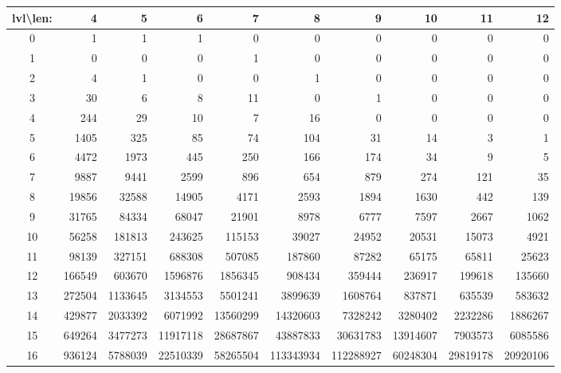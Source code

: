 \documentclass{article} %
\theoremstyle{definition}
\theoremstyle{theorem}
\theoremstyle{remark}
\theoremstyle{remark}
\begin{document}
    \begin{table}[!htbp]
        \vspace{-5pt}
        \footnotesize
        \begin{center}
        \setlength{\tabcolsep}{3.5pt}
            \begin{tabular}{|c||r|r|r|r|r|r|r|r|r|}
                \hline
                lvl{\bf\textbackslash}len: & 4 & 5 & 6 & 7 & 8 & 9 & 10 & 11 & 12 \\ \hline \hline

                0 & 1 & 1 & 1 & 0 & 0 & 0 & 0 & 0 & 0  \\\hline
                1 & 0 & 0 & 0 & 1 & 0 & 0 & 0 & 0 & 0  \\\hline
                2 & 4 & 1 & 0 & 0 & 1 & 0 & 0 & 0 & 0  \\\hline
                3 & 30 & 6 & 8 & 11 & 0 & 1 & 0 & 0 & 0 \\\hline
                4 & 244 & 29 & 10 & 7 & 16 & 0 & 0 & 0 & 0 \\\hline
                5 & 1405 & 325 & 85 & 74 & 104 & 31 & 14 & 3 & 1 \\\hline
                6 & 4472 & 1973 & 445 & 250 & 166 & 174 & 34 & 9 & 5 \\\hline
                7 & 9887 & 9441 & 2599 & 896 & 654 & 879 & 274 & 121 & 35 \\\hline
                8 & 19856 & 32588 & 14905 & 4171& 2593 & 1894 & 1630 & 442 & 139 \\\hline
                9 & 31765 & 84334 & 68047 & 21901 & 8978 & 6777 & 7597 & 2667 & 1062 \\\hline
                10 & 56258 & 181813 & 243625 & 115153 & 39027 & 24952 & 20531 & 15073 & 4921 \\\hline
                11 & 98139 & 327151 & 688308 & 507085 & 187860 & 87282 & 65175 & 65811 & 25623\\\hline
                12 & 166549 & 603670 & 1596876 & 1856345 & 908434 & 359444 & 236917 & 199618 & 135660\\\hline
                13 & 272504 & 1133645 & 3134553 & 5501241 & 3899639 & 1608764 & 837871 &  635539& 583632\\\hline
                14 & 429877 & 2033392 & 6071992 & 13560299 & 14320603 & 7328242 & 3280402 & 2232286& 1886267 \\\hline
                15 & 649264 & 3477273 & 11917118 & 28687867 & 43887833 & 30631783 & 13914607 & 7903573 & 6085586 \\\hline
                16 & 936124 & 5788039 & 22510339 & 58265504 & 113343934 & 112288927 & 60248304 & 29819178 & 20920106 \\\hline

\end{tabular}
\end{center}
\end{table}
\end{document}
